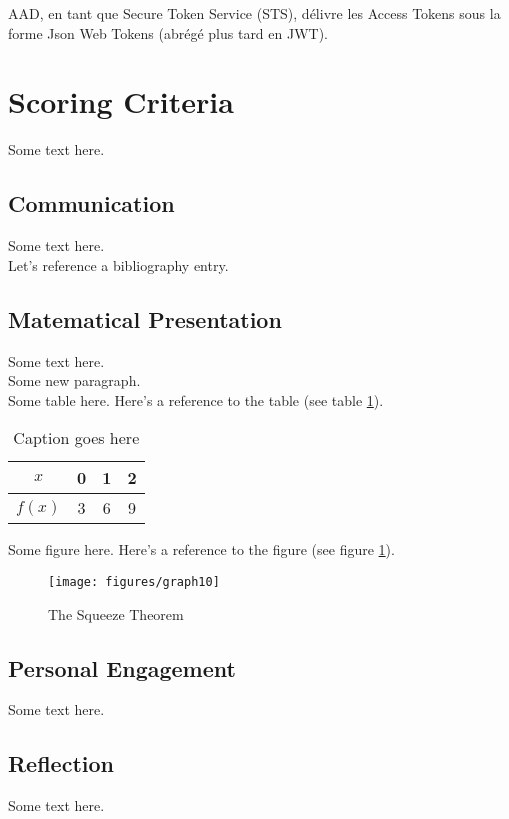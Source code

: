 \documentclass[11pt]{article}
\begin{document}
AAD, en tant que Secure Token Service (STS), délivre les Access Tokens sous la forme Json Web Tokens (abrégé plus tard en JWT).

\section{Scoring Criteria}
Some text here.

\subsection{Communication}
Some text here.\\
Let's reference a bibliography entry. \cite{Foo}\\

\subsection{Matematical Presentation}
Some text here.\\

Some new paragraph.\\

Some table here. Here's a reference to the table (see table \ref{tab:data1}).\\
\begin{table}[H]
  \centering
    \begin{tabular}{|c|c|c|c|} \hline
      $x$ & 0 & 1 & 2\\ \hline
      $f(x)$ & 3 & 6 & 9\\ \hline
    \end{tabular}
  \caption{Caption goes here}
  \label{tab:data1}
\end{table}

Some figure here. Here's a reference to the figure (see figure \ref{fig:squeeze}).\\
\begin{figure}[H]
  \centering
  \texttt{[image: figures/graph10]}
  \caption{The Squeeze Theorem}
  \label{fig:squeeze}
\end{figure}

\subsection{Personal Engagement}
Some text here.

\subsection{Reflection}
Some text here.
\end{document}
